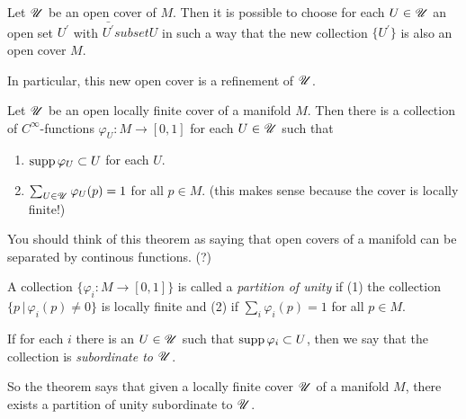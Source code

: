 \documentclass[11pt, english]{article}
\begin{document}
\begin{thm}
Let $\mathscr{U}$ be an open cover of $M$. Then it is possible to choose for each $U \in \mathscr{U}$ an open set $U^\prime$ with $\bar{U^\prime} subset U$ in such a way that the new collection $\{ U^\prime \}$ is also an open cover $M$. 
\end{thm}

\begin{remark}
In particular, this new open cover is a refinement of $\mathscr{U}$. 
\end{remark}

\begin{thm}

Let $\mathscr{U}$ be an open locally finite cover of a manifold $M$. Then there is a collection of $C^\infty$-functions  $\varphi_U:M \to [0,1]$ for each $U \in \mathscr{U}$ such that
\begin{enumerate}
\item $\operatorname{supp} \varphi_U \subset U$ for each $U$.
\item $\sum_{U \in \mathscr{U}} \varphi_U(p) = 1$ for all $p \in M$. (this makes sense because the cover is locally finite!)
\end{enumerate}
\end{thm}

You should think of this theorem as saying that open covers of a manifold can be separated by continous functions. (?)

\begin{defi}
  A collection $\{ \varphi_i:M \to [0,1] \}$ is called a \emph{partition of unity} if (1) the collection $\{ p \, | \, \varphi_i(p) \neq 0 \}$ is locally finite and (2) if $\sum_i \varphi_i(p)=1$ for all $p \in M$. 

If for each $i$ there is an $U \in \mathscr{U}$ such that $\operatorname{supp} \varphi_i \subset U$, then we say that the collection is \emph{subordinate to $\mathscr{U}$}. 
\end{defi}

So the theorem says that given a locally finite cover $\mathscr{U}$  of a manifold $M$, there exists a partition of unity subordinate to $\mathscr{U}$.
\end{document}
